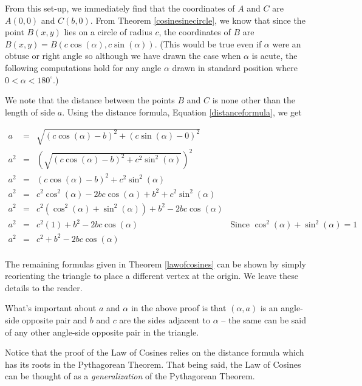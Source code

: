 From this set-up, we immediately find that the coordinates of $A$ and $C$ are $A(0,0)$ and $C(b,0)$.  From Theorem \ref{cosinesinecircle}, we know that since the point $B(x,y)$ lies on a circle of radius $c$, the coordinates of $B$ are $B(x,y) = B(c \cos(\alpha), c \sin(\alpha))$.  (This would be true even if $\alpha$ were an obtuse or right angle so although we have drawn the case when $\alpha$ is acute, the following computations hold for any angle $\alpha$ drawn in standard position where $0 < \alpha < 180^{\circ}$.) 

\smallskip

 We note that the distance between the points $B$ and $C$ is none other than the length of side $a$.  Using the distance formula, Equation \ref{distanceformula}, we get

\[\begin{array}{rclr}
a & = & \sqrt{(c \cos(\alpha) - b)^{2} + (c \sin(\alpha) - 0)^2} & \\ [3pt]
a^{2} & = & \left(\sqrt{(c \cos(\alpha) - b)^{2} + c^2 \sin^2(\alpha)}\right)^2 & \\  [3pt]
a^2 & = &  (c \cos(\alpha) - b)^{2} + c^2 \sin^2(\alpha) & \\  [3pt]
a^2 & = & c^2 \cos^2(\alpha) - 2bc \cos(\alpha) + b^2 + c^2 \sin^2(\alpha) & \\  [3pt]
a^2 & = & c^2\left(\cos^2(\alpha) + \sin^2(\alpha)\right) + b^2 - 2bc \cos(\alpha) & \\  [3pt]
a^2 & = & c^2(1) + b^2 - 2bc \cos(\alpha) & \text{Since $\cos^2(\alpha) + \sin^2(\alpha) = 1$}\\  [3pt]
a^2 & = & c^2 + b^2 - 2bc \cos(\alpha) & \\
\end{array} \]

The remaining formulas given in Theorem \ref{lawofcosines} can be shown by simply reorienting the triangle to place a different vertex at the origin.  We leave these details to the reader.  

\smallskip

What's important about $a$ and $\alpha$ in the above proof is that $(\alpha,a)$ is an angle-side opposite pair and $b$ and $c$ are the sides adjacent to $\alpha$ -- the same can be said of any other angle-side opposite pair in the triangle.   

\smallskip

Notice that the proof of the Law of Cosines relies on the distance formula which has its roots in the Pythagorean Theorem.  That being said, the Law of Cosines can be thought of as a \textit{generalization} of the Pythagorean Theorem. 

